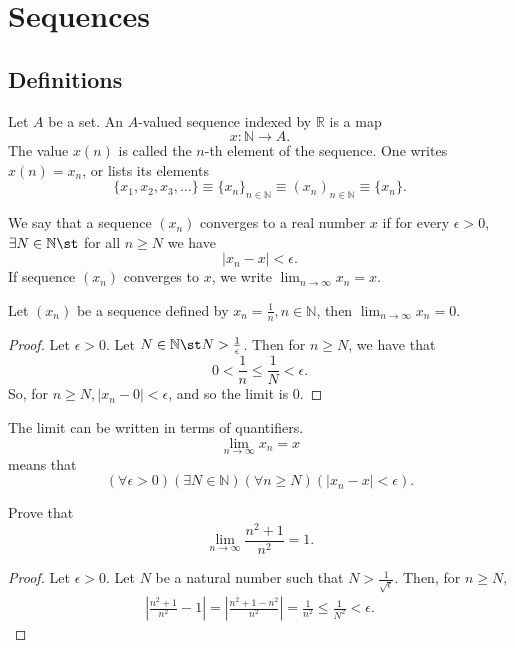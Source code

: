 \documentclass[12pt]{article}
\begin{document}
\section{Sequences}
\subsection{Definitions}
\begin{definition}
  Let $A$ be a set. An $A$-valued sequence indexed by $\mathbb{R}$ is a map \[x: \mathbb{N} \to A.\] The value $x(n)$ is called the $n$-th element of the sequence. One writes $x(n) = x_n$, or lists its elements \[\{x_1, x_2, x_3, \dots\} \equiv \{x_n\}_{n \in \mathbb{N}} \equiv (x_n)_{n \in \mathbb{N}} \equiv \{x_n\}.\]
\end{definition}

\begin{definition}[Convergence]
  We say that a sequence $(x_n)$ converges to a real number $x$ if for every $\epsilon > 0$, $\exists N \in \mathbb{N} \st$ for all $n \geq N$ we have \[|x_n - x| < \epsilon.\] If sequence $(x_n)$ converges to $x$, we write $\lim_{n \to \infty} x_n = x$.
\end{definition}

\begin{example}
  Let $(x_n)$ be a sequence defined by $x_n = \frac{1}{n}, n \in \mathbb{N}$, then $\lim_{n \to \infty} x_n = 0$.
  \begin{proof}
    Let $\epsilon > 0$. Let $N \in \mathbb{N} \st N > \frac{1}{\epsilon}$. Then for $n \geq N$, we have that $$0 < \frac{1}{n}\leq \frac{1}{N} < \epsilon.$$ So, for $n \geq N, |x_n - 0| < \epsilon$, and so the limit is $0$.
  \end{proof}
\end{example}



\begin{definition}
  The limit can be written in terms of quantifiers.
  \[\lim_{n \to \infty} x_n = x\] means that \[(\forall \epsilon > 0)(\exists N \in \mathbb{N})(\forall n \geq N)(|x_n - x| < \epsilon).\]
\end{definition}

\begin{example}
  Prove that $$\lim_{n\to \infty} \frac{n^2+1}{n^2} = 1.$$

\begin{proof}
  Let $\epsilon > 0$. Let $N$ be a natural number such that $N > \frac{1}{\sqrt{\epsilon}}$. Then, for $n \geq N$,
  \begin{align*}
    |\frac{n^2+1}{n^2}-1| = |\frac{n^2+1-n^2}{n^2}| = \frac{1}{n^2} \leq \frac{1}{N^2} < \epsilon.
  \end{align*}
\end{proof}
\end{example}
\end{document}
